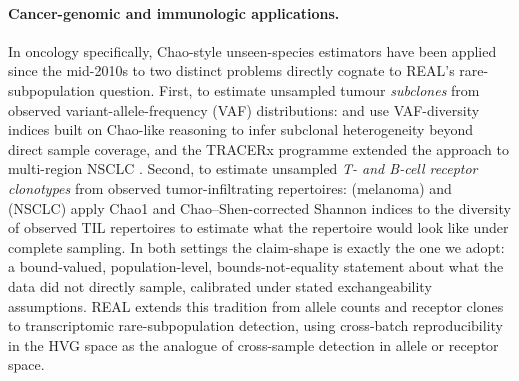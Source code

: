 \paragraph*{Cancer-genomic and immunologic applications.}
In oncology specifically, Chao-style unseen-species estimators have been applied since the mid-2010s to two distinct problems directly cognate to REAL's rare-subpopulation question. First, to estimate unsampled tumour \emph{subclones} from observed variant-allele-frequency (VAF) distributions: \citet{williams2016identification} and \citet{sottoriva2015big} use VAF-diversity indices built on Chao-like reasoning to infer subclonal heterogeneity beyond direct sample coverage, and the TRACERx programme extended the approach to multi-region NSCLC \citep{debruin2014spatial,jamalhanjani2017tracking}. Second, to estimate unsampled \emph{T- and B-cell receptor clonotypes} from observed tumor-infiltrating repertoires: \citet{valpione2020immune} (melanoma) and \citet{reuben2020comprehensive} (NSCLC) apply Chao1 and Chao--Shen-corrected Shannon indices to the diversity of observed TIL repertoires to estimate what the repertoire would look like under complete sampling. In both settings the claim-shape is exactly the one we adopt: a bound-valued, population-level, bounds-not-equality statement about what the data did not directly sample, calibrated under stated exchangeability assumptions. REAL extends this tradition from allele counts and receptor clones to transcriptomic rare-subpopulation detection, using cross-batch reproducibility in the HVG space as the analogue of cross-sample detection in allele or receptor space.

